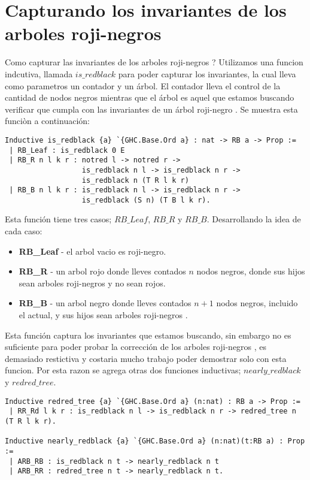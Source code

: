 \documentclass[letterpaper,12pt,oneside]{book}
\newcommand{\arn}{árbol roji-negro }
\newcommand{\arns}{arboles roji-negros }
\begin{document}
\section{Capturando los invariantes de los \arns}
Como capturar las invariantes de los \arns ? Utilizamos una funcion indcutiva, llamada $is\_redblack$
para poder capturar los invariantes, la cual lleva como parametros un contador y un \'arbol. El contador
lleva el control de la cantidad de nodos negros mientras que el \'arbol es aquel que estamos buscando
verificar que cumpla con las invariantes de un \arn. Se muestra esta funci\`on a continuaci\'on:

\begin{verbatim}
Inductive is_redblack {a} `{GHC.Base.Ord a} : nat -> RB a -> Prop :=
 | RB_Leaf : is_redblack 0 E
 | RB_R n l k r : notred l -> notred r ->
                  is_redblack n l -> is_redblack n r ->
                  is_redblack n (T R l k r)
 | RB_B n l k r : is_redblack n l -> is_redblack n r ->
                  is_redblack (S n) (T B l k r).
\end{verbatim}

Esta funci\'on tiene tres casos; $RB\_Leaf$, $RB\_R$ y $RB\_B$. Desarrollando la idea de cada caso:
\begin{itemize}
        \item \textbf{RB\_Leaf} - el arbol vacio es roji-negro.
        \item \textbf{RB\_R} - un arbol rojo donde lleves contados $n$ nodos negros, donde sus hijos sean \arns y no sean rojos.
        \item \textbf{RB\_B} - un arbol negro donde lleves contados $n+1$ nodos negros, incluido el actual, y sus hijos sean \arns.
\end{itemize}

Esta funci\'on captura los invariantes que estamos buscando, sin embargo no es suficiente para poder probar la correcci\'on de los \arns,
es demasiado restictiva y costaria mucho trabajo poder demostrar solo con esta funcion. Por esta razon se agrega otras dos funciones inductivas;
$nearly\_redblack$ y $redred\_tree$. 

\begin{verbatim}
Inductive redred_tree {a} `{GHC.Base.Ord a} (n:nat) : RB a -> Prop :=
 | RR_Rd l k r : is_redblack n l -> is_redblack n r -> redred_tree n (T R l k r).

Inductive nearly_redblack {a} `{GHC.Base.Ord a} (n:nat)(t:RB a) : Prop :=
 | ARB_RB : is_redblack n t -> nearly_redblack n t
 | ARB_RR : redred_tree n t -> nearly_redblack n t.
\end{verbatim}
\end{document}
